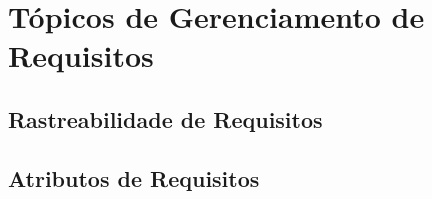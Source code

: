 
\chapter[Tópicos de Gerenciamento de Requisitos]{Tópicos de Gerenciamento de Requisitos}
\section{Rastreabilidade de Requisitos}
\section{Atributos de Requisitos}
